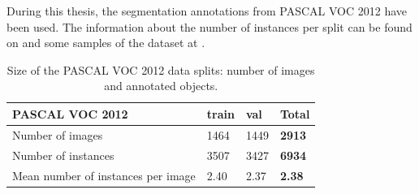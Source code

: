 During this thesis, the segmentation annotations from PASCAL VOC 2012 have been used. The information about the number of instances per split can be found on  and some samples of the dataset at .

\begin{table}[h]
\centering
\begin{tabular}{l|lll}
PASCAL VOC 2012                    & train & val  & \textbf{Total} \\
\hline
Number of images                   & 1464  & 1449 & \textbf{2913}  \\
Number of instances                & 3507  & 3427 & \textbf{6934}  \\
Mean number of instances per image & 2.40  & 2.37 & \textbf{2.38}  \\
\end{tabular}
\caption{Size of the PASCAL VOC 2012 data splits: number of images and annotated objects.}
\label{tab:pascal}
\end{table}


